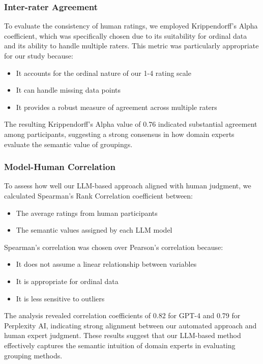 \documentclass{article}
\begin{document}
\subsubsection*{Inter-rater Agreement}
To evaluate the consistency of human ratings, we employed Krippendorff's Alpha coefficient, which was specifically chosen due to its suitability for ordinal data and its ability to handle multiple raters. This metric was particularly appropriate for our study because:
\begin{itemize}
    \item It accounts for the ordinal nature of our 1-4 rating scale
    \item It can handle missing data points
    \item It provides a robust measure of agreement across multiple raters
\end{itemize}

The resulting Krippendorff's Alpha value of 0.76 indicated substantial agreement among participants, suggesting a strong consensus in how domain experts evaluate the semantic value of groupings.

\subsubsection*{Model-Human Correlation}
To assess how well our LLM-based approach aligned with human judgment, we calculated Spearman's Rank Correlation coefficient between:
\begin{itemize}
    \item The average ratings from human participants
    \item The semantic values assigned by each LLM model
\end{itemize}

Spearman's correlation was chosen over Pearson's correlation because:
\begin{itemize}
    \item It does not assume a linear relationship between variables
    \item It is appropriate for ordinal data
    \item It is less sensitive to outliers
\end{itemize}

The analysis revealed correlation coefficients of 0.82 for GPT-4 and 0.79 for Perplexity AI, indicating strong alignment between our automated approach and human expert judgment. These results suggest that our LLM-based method effectively captures the semantic intuition of domain experts in evaluating grouping methods.
\end{document}
